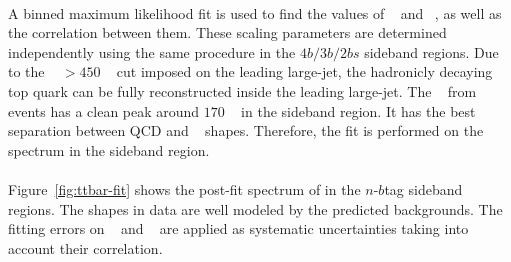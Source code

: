 \paragraph{}
A binned maximum likelihood fit is used to find the values of \muqcd~ and \alphatt~, as well as the correlation between them.
These scaling parameters are determined independently using the same procedure in the $4b/3b/2bs$ sideband regions.
Due to the \pt~ $>450$ \GeV~ cut imposed on the leading large-\R jet, the hadronicly decaying top quark can be fully reconstructed inside the leading large-\R jet. 
The \mleadJ~ from \ttbar~ events has a clean peak around $170$ \GeV~ in the sideband region.
It has the best separation between QCD and \ttbar~ shapes.
Therefore, the fit is performed on the \mleadJ spectrum in the sideband region.

\paragraph{}
Figure~\ref{fig:ttbar-fit} shows the post-fit spectrum of \mleadJ in the $n$-$b$tag sideband regions.
The \mleadJ shapes in data are well modeled by the predicted backgrounds. 
The fitting errors on \muqcd~ and \alphatt~ are applied as systematic uncertainties taking into account their correlation.

